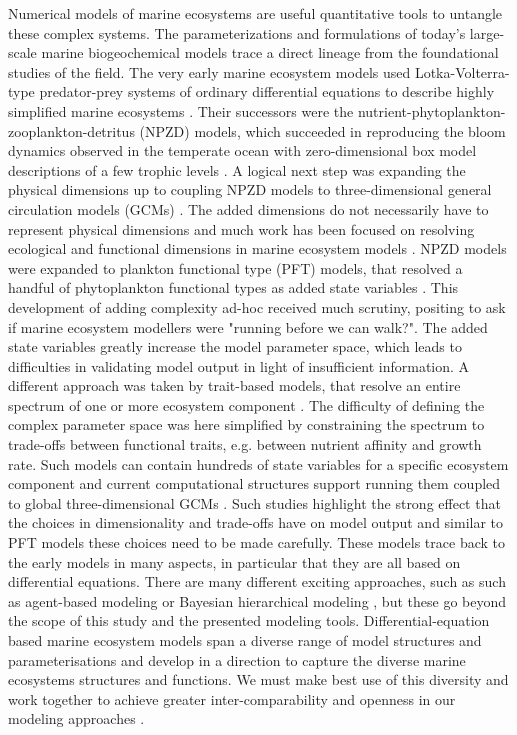 \documentclass[journal abbreviation, manuscript]{copernicus}
\begin{document}
Numerical models of marine ecosystems are useful quantitative tools to untangle these complex systems. The parameterizations and formulations of today's large-scale marine biogeochemical models trace a direct lineage from the foundational studies of the field. The very early marine ecosystem models used Lotka-Volterra-type predator-prey systems of ordinary differential equations to describe highly simplified marine ecosystems \citep{Fleming1939, Riley1946FactorsBank}. Their successors were the nutrient-phytoplankton-zooplankton-detritus (NPZD) models, which succeeded in reproducing the bloom dynamics observed in the temperate ocean with zero-dimensional box model descriptions of a few trophic levels \citep{Evans1985ACycles, Fasham1990a}. A logical next step was expanding the physical dimensions up to coupling NPZD models to three-dimensional general circulation models (GCMs) \citep[e.g.][]{Sarmiento1993AZone}. The added dimensions do not necessarily have to represent physical dimensions and much work has been focused on resolving ecological and functional dimensions in marine ecosystem models \citep{Follows2011ModelingMicrobes}. NPZD models were expanded to plankton functional type (PFT) models, that resolved a handful of phytoplankton functional types as added state variables \citep{LeQuere2005}. This development of adding complexity ad-hoc received much scrutiny, positing \citet{Anderson2005} to ask if marine ecosystem modellers were "running before we can walk?". The added state variables greatly increase the model parameter space, which leads to difficulties in validating model output in light of insufficient information. A different approach was taken by trait-based models, that resolve an entire spectrum of one or more ecosystem component \citep{Bruggeman2007a, Merico2009, Follows2007EmergentOcean}. The difficulty of defining the complex parameter space was here simplified by constraining the spectrum to trade-offs between functional traits, e.g. between nutrient affinity and growth rate.
Such models can contain hundreds of state variables for a specific ecosystem component and current computational structures support running them coupled to global three-dimensional GCMs \citep{Dutkiewicz2020DimensionsDiversity}. Such studies highlight the strong effect that the choices in dimensionality and trade-offs have on model output and similar to PFT models these choices need to be made carefully.
These models trace back to the early models in many aspects, in particular that they are all based on differential equations. There are many different exciting approaches, such as such as agent-based modeling \citep{Hellweger2016AdvancingModelling} or Bayesian hierarchical modeling \citep{Coll2019PredictingApproaches}, but these go beyond the scope of this study and the presented modeling tools.
Differential-equation based marine ecosystem models span a diverse range of model structures and parameterisations and develop in a direction to capture the diverse marine ecosystems structures and functions. We must make best use of this diversity and work together to achieve greater inter-comparability and openness in our modeling approaches \citep{Heymans2020TheChallenge}.
\end{document}

